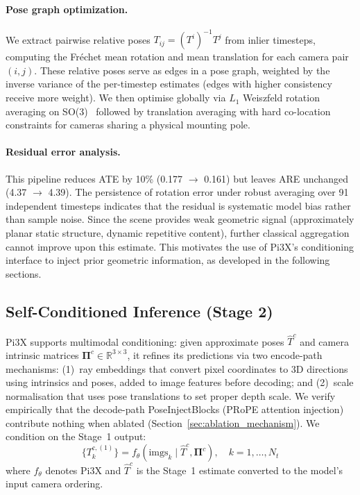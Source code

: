 \paragraph{Pose graph optimization.} We extract pairwise relative poses $T_{ij} = (T^i)^{-1} T^j$ from inlier timesteps, computing the Fr\'{e}chet mean rotation and mean translation for each camera pair $(i, j)$. These relative poses serve as edges in a pose graph, weighted by the inverse variance of the per-timestep estimates (edges with higher consistency receive more weight). We then optimise globally via $L_1$ Weiszfeld rotation averaging on SO(3)~\cite{hartley2013} followed by translation averaging with hard co-location constraints for cameras sharing a physical mounting pole.

\paragraph{Residual error analysis.} This pipeline reduces ATE by 10\% (0.177 $\rightarrow$ 0.161) but leaves ARE unchanged (4.37\degree{} $\rightarrow$ 4.39\degree{}). The persistence of rotation error under robust averaging over 91 independent timesteps indicates that the residual is systematic model bias rather than sample noise. Since the scene provides weak geometric signal (approximately planar static structure, dynamic repetitive content), further classical aggregation cannot improve upon this estimate. This motivates the use of Pi3X's conditioning interface to inject prior geometric information, as developed in the following sections.

\subsection{Self-Conditioned Inference (Stage 2)}
\label{sec:stage2}

Pi3X supports multimodal conditioning: given approximate poses $\hat{T}^c$ and camera intrinsic matrices $\boldsymbol{\Pi}^c \in \mathbb{R}^{3 \times 3}$, it refines its predictions via two encode-path mechanisms: (1)~ray embeddings that convert pixel coordinates to 3D directions using intrinsics and poses, added to image features before decoding; and (2)~scale normalisation that uses pose translations to set proper depth scale. We verify empirically that the decode-path PoseInjectBlocks (PRoPE attention injection) contribute nothing when ablated (Section~\ref{sec:ablation_mechanism}). We condition on the Stage~1 output:
\begin{equation}
    \{T_k^{c,(1)}\} = f_\theta(\text{imgs}_k \mid \hat{T}^c, \boldsymbol{\Pi}^c), \quad k = 1, \ldots, N_t
\end{equation}
where $f_\theta$ denotes Pi3X and $\hat{T}^c$ is the Stage~1 estimate converted to the model's input camera ordering.

